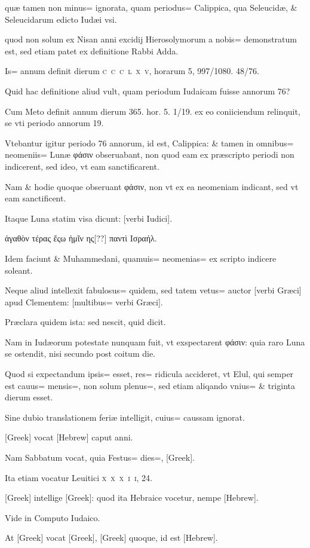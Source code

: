 \begin{parnumbers}
quæ tamen non minus= ignorata, quam periodus= Calippica, qua Seleucidæ, \& Seleucidarum edicto Iudæi vsi.

quod non solum ex Nisan anni excidij Hierosolymorum a nobis= demonstratum est, sed etiam patet ex definitione Rabbi Adda.

Is= annum definit dierum \textsc{c~c~c~l~x~v}, horarum 5, 997/1080. 48/76.

Quid hac definitione aliud vult, quam periodum Iudaicam fuisse annorum 76?

Cum Meto definit annum dierum 365. hor. 5. 1/19. ex eo coniiciendum relinquit, se vti periodo annorum 19.

Vtebantur igitur periodo 76 annorum, id est, Calippica: \& tamen in omnibus= neomeniis= Lunæ φάσιν obseruabant, non quod eam ex præscripto periodi non indicerent, sed ideo, vt eam sanctificarent.

Nam \& hodie quoque obseruant φάσιν, non vt ex ea neomeniam indicant, sed vt eam sanctificent.

Itaque Luna statim visa dicunt: [verbi Iudici].

ἀγαθὸν τέρας ἔςω ἡμῖν ης[??] παντὶ Ισραήλ.

Idem faciunt \& Muhammedani, quamuis= neomenias= ex scripto indicere soleant.

Neque aliud intellexit fabulosus= quidem, sed tatem vetus= auctor [verbi Græci] apud Clementem: [multibus= verbi Græci].

Præclara
quidem ista: sed nescit, quid dicit.

Nam in Iudæorum potestate nunquam fuit, vt exspectarent φάσιν: quia raro Luna se ostendit, nisi secundo post coitum die.

Quod si expectandum ipsis= esset, res= ridicula accideret, vt Elul, qui semper est cauus= mensis=, non solum plenus=, sed etiam aliqando vnius= \& triginta dierum esset.

Sine dubio translationem feriæ intelligit, cuius= caussam ignorat.

[Greek] vocat [Hebrew] caput anni.

Nam Sabbatum vocat, quia Festus= dies=, [Greek].

Ita etiam vocatur Leuitici \textsc{x~x~x~i~i}, 24.

[Greek] intellige [Greek]: quod ita Hebraice vocetur, nempe [Hebrew].

Vide in Computo Iudaico.

At [Greek] vocat [Greek], [Greek] quoque, id est [Hebrew].


\end{parnumbers}
